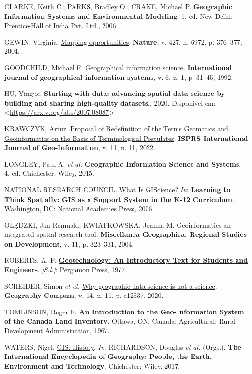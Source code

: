 \documentclass[
  letterpaper,
  DIV=11,
  numbers=noendperiod]{scrreprt}
\newlength{\cslhangindent}
\newenvironment{CSLReferences}[2] %
 {\begin{list}{}{%
  \setlength{\itemindent}{0pt}
  \setlength{\leftmargin}{0pt}
  \setlength{\parsep}{0pt}
  \ifodd #1
   \setlength{\leftmargin}{\cslhangindent}
   \setlength{\itemindent}{-1\cslhangindent}
  \fi
  \setlength{\itemsep}{#2\baselineskip}}}
 {\end{list}}
\begin{document}
\begin{CSLReferences}{0}{1}
CLARKE, Keith C.; PARKS, Bradley O.; CRANE, Michael P.
\textbf{Geographic Information Systems and Environmental Modeling}. 1.
ed. New Delhi: Prentice-Hall of India Pvt. Ltd., 2006.

GEWIN, Virginia. \href{https://doi.org/10.1038/nj6972-376a}{Mapping
opportunities}. \textbf{Nature}, v. 427, n. 6972, p. 376--377, 2004.

GOODCHILD, Michael F. Geographical information science.
\textbf{International journal of geographical information systems}, v.
6, n. 1, p. 31--45, 1992.

HU, Yingjie. \textbf{Starting with data: advancing spatial data science
by building and sharing high-quality datasets}., 2020. Disponível em:
\textless{}\url{https://arxiv.org/abs/2007.08087}\textgreater{}

KRAWCZYK, Artur. \href{https://doi.org/10.3390/ijgi11110557}{Proposal of
Redefinition of the Terms Geomatics and Geoinformatics on the Basis of
Terminological Postulates}. \textbf{ISPRS International Journal of
Geo-Information}, v. 11, n. 11, 2022.

LONGLEY, Paul A. \emph{et al.} \textbf{Geographic Information Science
and Systems}. 4. ed. Chichester: Wiley, 2015.

NATIONAL RESEARCH COUNCIL. \href{https://doi.org/10.17226/10335}{What Is
GIScience?} \emph{In}: \textbf{Learning to Think Spatially: GIS as a
Support System in the K-12 Curriculum}. Washington, DC: National
Academies Press, 2006.

OLĘDZKI, Jan Romuald; KWIATKOWSKA, Joanna M. Geoinformatics-an
integrated spatial research tool. \textbf{Miscellanea Geographica.
Regional Studies on Development}, v. 11, p. 323--331, 2004.

ROBERTS, A. F.
\textbf{\href{https://books.google.com.br/books?id=Svk1AQAAIAAJ}{Geotechnology:
An Introductory Text for Students and Engineers}}. \emph{{[}S.l.{]}}:
Pergamon Press, 1977.

SCHEIDER, Simon \emph{et al.}
\href{https://doi.org/10.1111/gec3.12537}{Why geographic data science is
not a science}. \textbf{Geography Compass}, v. 14, n. 11, p. e12537,
2020.

TOMLINSON, Roger F. \textbf{An Introduction to the Geo-Information
System of the Canada Land Inventory}. Ottawa, ON, Canada: Agricultural;
Rural Development Administration, 1967.

WATERS, Nigel.
\href{https://doi.org/10.1002/9781118786352.wbieg0841}{GIS: History}.
\emph{In}: RICHARDSON, Douglas \emph{et al.} (Orgs.). \textbf{The
International Encyclopedia of Geography: People, the Earth, Environment
and Technology}. Chichester: Wiley, 2017.

\end{CSLReferences}
\end{document}
